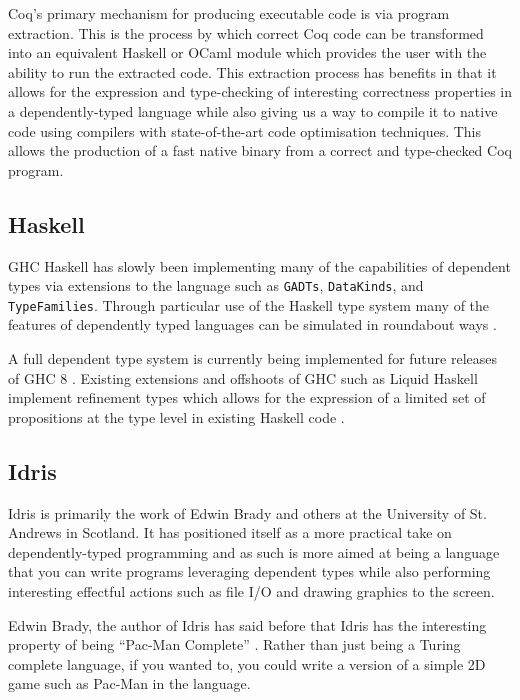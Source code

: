 \documentclass[a4paper, notitlepage]{report}
\begin{document}
Coq's primary mechanism for producing executable code is via program extraction.
This is the process by which correct Coq code can be transformed into an
equivalent Haskell or OCaml module which provides the user with the ability to
run the extracted code. This extraction process has benefits in that it allows
for the expression and type-checking of interesting correctness properties in a
dependently-typed language while also giving us a way to compile it to native
code using compilers with state-of-the-art code optimisation techniques. This
allows the production of a fast native binary from a correct and type-checked
Coq program.

\subsection{Haskell}
\label{sec:orgd3474a5}
GHC Haskell has slowly been implementing many of the capabilities of dependent
types via extensions to the language such as \texttt{GADTs}, \texttt{DataKinds}, and
\texttt{TypeFamilies}. Through particular use of the Haskell type system many of the
features of dependently typed languages can be simulated in roundabout ways
\cite{mcbride_faking_2002,lindley_hasochism_2013}.

A full dependent type system is currently being implemented for future releases
of GHC 8 \cite{eisenberg_dependent_2016,weirich_specif_2017}. Existing
extensions and offshoots of GHC such as Liquid Haskell implement refinement
types which allows for the expression of a limited set of propositions at the
type level in existing Haskell code \cite{vazou_refinement_2014}.

\subsection{Idris}
\label{sec:org9ab10f9}
Idris is primarily the work of Edwin Brady and others at the University of St.
Andrews in Scotland. It has positioned itself as a more practical take on
dependently-typed programming and as such is more aimed at being a language that
you can write programs leveraging dependent types while also performing
interesting effectful actions such as file I/O and drawing graphics to the
screen.

Edwin Brady, the author of Idris has said before that Idris has the interesting
property of being ``Pac-Man Complete'' \cite{scala_world_2015}. Rather than just
being a Turing complete language, if you wanted to, you could write a version of
a simple 2D game such as Pac-Man in the language.
\end{document}

